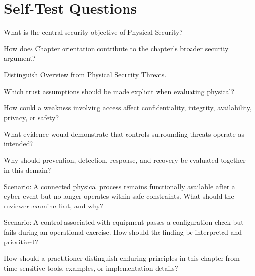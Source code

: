 \documentclass[11pt,letterpaper]{article}
\begin{document}
\section*{Self-Test Questions}
\begin{CornellRecallList}
\item What is the central security objective of Physical Security?
\item How does Chapter orientation contribute to the chapter's broader security argument?
\item Distinguish Overview from Physical Security Threats.
\item Which trust assumptions should be made explicit when evaluating physical?
\item How could a weakness involving access affect confidentiality, integrity, availability, privacy, or safety?
\item What evidence would demonstrate that controls surrounding threats operate as intended?
\item Why should prevention, detection, response, and recovery be evaluated together in this domain?
\item Scenario: A connected physical process remains functionally available after a cyber event but no longer operates within safe constraints. What should the reviewer examine first, and why?
\item Scenario: A control associated with equipment passes a configuration check but fails during an operational exercise. How should the finding be interpreted and prioritized?
\item How should a practitioner distinguish enduring principles in this chapter from time-sensitive tools, examples, or implementation details?
\end{CornellRecallList}
\end{document}
